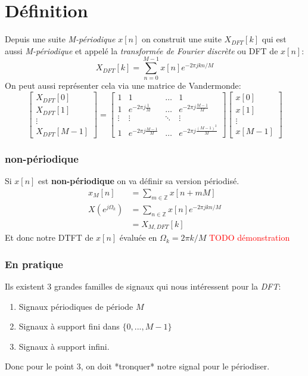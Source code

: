 \documentclass{report}
\begin{document}
\section{Définition}
Depuis une suite \textit{M-périodique} $x[n]$ on construit une suite $X_{DFT}[k]$ qui est aussi \textit{M-périodique} et appelé la \textit{transformée de Fourier discrète} ou DFT de $x[n]$:
\begin{equation}
X_{DFT}[k] = \sum_{n=0}^{M-1}x[n]e^{-2\pi j k n /M}
\end{equation}
On peut aussi représenter cela via une matrice de Vandermonde:
\begin{equation}
\begin{bmatrix}
X_{DFT}[0]\\
X_{DFT}[1]\\
\vdots\\
X_{DFT}[M-1]
\end{bmatrix} =
\begin{bmatrix}
1 & 1 & \ldots & 1\\
1 & e^{-2\pi j \frac{1}{M}} & \ldots & e^{-2\pi j \frac{M-1}{M}}\\
\vdots & \vdots & \ddots & \vdots\\
1 & e^{-2\pi j \frac{M-1}{M}} & \ldots & e^{-2 \pi j \frac{(M-1)^2}{M}} 
\end{bmatrix}
\begin{bmatrix}
x[0]\\
x[1]\\
\vdots \\
x[M-1]
\end{bmatrix}
\end{equation}

\subsubsection{non-périodique}
Si $x[n]$ est \textbf{non-périodique} on va définir sa version périodisé.
\begin{align*}
x_M[n] &= \sum_{m \in \mathbb{Z}} x[n + mM]\\
X(e^{j\Omega_k}) &= \sum_{n\in \mathbb{Z}} x[n]e^{-2\pi j k n/M}\\
&= X_{M, DFT}[k]
\end{align*}
Et donc notre DTFT de $x[n]$ évaluée en $\Omega_k = 2\pi k / M$
\textcolor{red}{TODO démonstration}

\subsubsection{En pratique}
Ils existent 3 grandes familles de signaux qui nous intéressent pour la \textit{DFT}:
\begin{enumerate}
\item Signaux périodiques de période $M$
\item Signaux à support fini dans $\{0, ..., M-1\}$
\item Signaux à support infini.
\end{enumerate}
Donc pour le point 3, on doit *tronquer* notre signal pour le périodiser.
\end{document}
